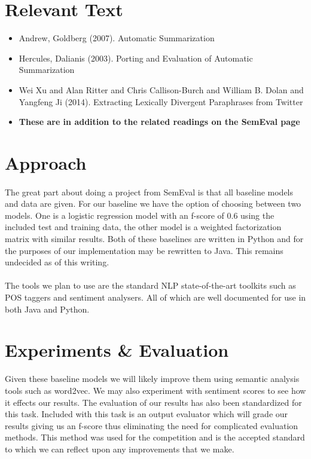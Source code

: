 \documentclass[dvips,12pt]{article}
\begin{document}
\section{Relevant Text}
\begin{itemize}
\item Andrew, Goldberg (2007). Automatic Summarization
\item Hercules, Dalianis (2003). Porting and Evaluation of Automatic Summarization
\item Wei Xu and Alan Ritter and Chris Callison-Burch and William B. Dolan and Yangfeng Ji (2014). Extracting Lexically Divergent Paraphrases from Twitter
\item \textbf{These are in addition to the related readings on the SemEval page}
\end{itemize}



\section{Approach}
\paragraph{}
The great part about doing a project from SemEval is that all baseline models and data are given. For our baseline we have the option of choosing between two models. One is a logistic regression model with an f-score of 0.6 using the included test and training data, the other model is a weighted factorization matrix with similar results. Both of these baselines are written in Python and for the purposes of our implementation may be rewritten to Java. This remains undecided as of this writing.

\paragraph{}
The tools we plan to use are the standard NLP state-of-the-art toolkits such as POS taggers and sentiment analysers. All of which are well documented for use in both Java and Python.


\section{Experiments \& Evaluation}
Given these baseline models we will likely improve them using semantic analysis tools such as word2vec. We may also experiment with sentiment scores to see how it effects our results. The evaluation of our results has also been standardized for this task. Included with this task is an output evaluator which will grade our results giving us an f-score thus eliminating the need for complicated evaluation methods. This method was used for the competition and is the accepted standard to which we can reflect upon any improvements that we make.
\end{document}
